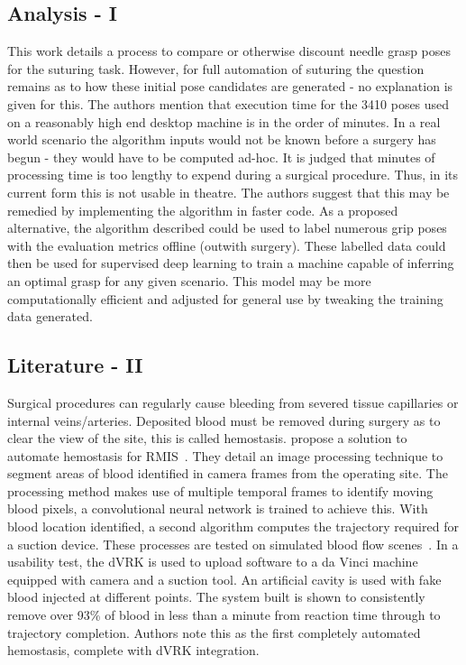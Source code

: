 \documentclass[english]{sobraep}
\begin{document}
\subsection{Analysis - I}
This work details a process to compare or otherwise discount needle grasp poses for the suturing task. However, for full automation of suturing the question remains as to how these initial pose candidates are generated - no explanation is given for this. The authors mention that execution time for the 3410 poses used on a reasonably high end desktop machine is in the order of minutes. In a real world scenario the algorithm inputs would not be known before a surgery has begun - they would have to be computed ad-hoc. It is judged that minutes of processing time is too lengthy to expend during a surgical procedure. Thus, in its current form this is not usable in theatre. The authors suggest that this may be remedied by implementing the algorithm in faster code. As a proposed alternative, the algorithm described could be used to label numerous grip poses with the evaluation metrics offline (outwith surgery). These labelled data could then be used for supervised deep learning to train a machine capable of inferring an optimal grasp for any given scenario. This model may be more computationally efficient and adjusted for general use by tweaking the training data generated.    
\subsection{Literature - II}
Surgical procedures can regularly cause bleeding from severed tissue capillaries or internal veins/arteries. Deposited blood must be removed during surgery as to clear the view of the site, this is called hemostasis. \citeauthor{blood-suck} propose a solution to automate hemostasis for RMIS~\cite{blood-suck}. They detail an image processing technique to segment areas of blood identified in camera frames from the operating site. The processing method makes use of multiple temporal frames to identify moving blood pixels, a convolutional neural network is trained to achieve this. With blood location identified, a second algorithm computes the trajectory required for a suction device. These processes are tested on simulated blood flow scenes~\cite[Figure 4]{blood-suck}. In a usability test, the dVRK is used to upload software to a da Vinci machine equipped with camera and a suction tool. An artificial cavity is used with fake blood injected at different points. The system built is shown to consistently remove over 93\% of blood in less than a minute from reaction time through to trajectory completion. Authors note this as the first completely automated hemostasis, complete with dVRK integration. 
\end{document}
